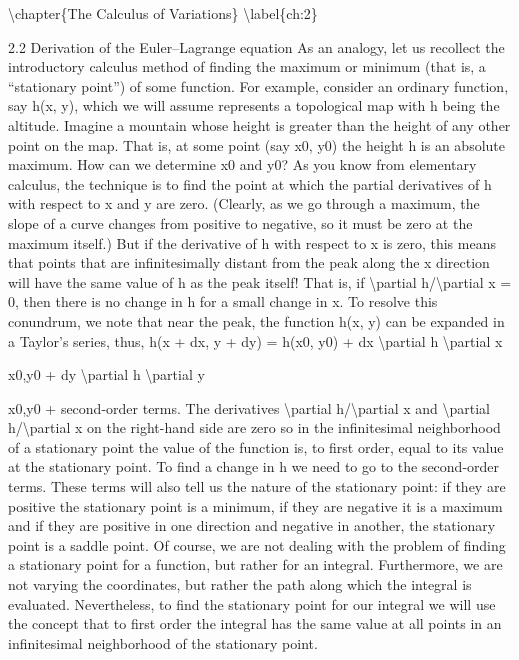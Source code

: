 \textbackslash{}chapter\{The Calculus of Variations\}
\textbackslash{}label\{ch:2\}

2.2
Derivation of the Euler--Lagrange equation
As an analogy, let us recollect the introductory calculus method of finding
the maximum or minimum (that is, a ``stationary point'') of some function. For
example, consider an ordinary function, say h(x, y), which we will assume
represents a topological map with h being the altitude. Imagine a mountain
whose height is greater than the height of any other point on the map. That
is, at some point (say x0, y0) the height h is an absolute maximum. How can
we determine x0 and y0? As you know from elementary calculus, the technique is to find the point at which the partial derivatives of h with respect
to x and y are zero. (Clearly, as we go through a maximum, the slope of a
curve changes from positive to negative, so it must be zero at the maximum
itself.) But if the derivative of h with respect to x is zero, this means that
points that are infinitesimally distant from the peak along the x direction will
have the same value of h as the peak itself! That is, if \textbackslash{}partial h/\textbackslash{}partial x = 0, then there
is no change in h for a small change in x. To resolve this conundrum, we
note that near the peak, the function h(x, y) can be expanded in a Taylor's
series, thus,
h(x + dx, y + dy) = h(x0, y0) + dx \textbackslash{}partial h
\textbackslash{}partial x

x0,y0
+ dy \textbackslash{}partial h
\textbackslash{}partial y

x0,y0
+ second-order terms.
The derivatives \textbackslash{}partial h/\textbackslash{}partial x and \textbackslash{}partial h/\textbackslash{}partial x on the right-hand side are zero so in the
infinitesimal neighborhood of a stationary point the value of the function is, to
first order, equal to its value at the stationary point. To find a change in h we
need to go to the second-order terms. These terms will also tell us the nature
of the stationary point: if they are positive the stationary point is a minimum,
if they are negative it is a maximum and if they are positive in one direction
and negative in another, the stationary point is a saddle point.
Of course, we are not dealing with the problem of finding a stationary point
for a function, but rather for an integral. Furthermore, we are not varying the
coordinates, but rather the path along which the integral is evaluated. Nevertheless, to find the stationary point for our integral we will use the concept that
to first order the integral has the same value at all points in an infinitesimal
neighborhood of the stationary point.

